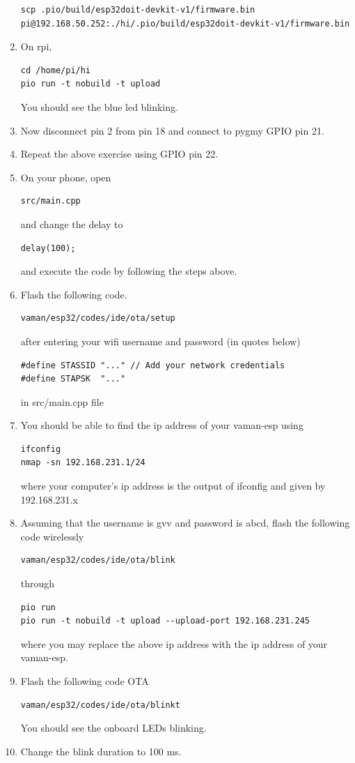 \begin{enumerate}[label=\arabic*.,ref=\theenumi]
\begin{lstlisting}
scp .pio/build/esp32doit-devkit-v1/firmware.bin pi@192.168.50.252:./hi/.pio/build/esp32doit-devkit-v1/firmware.bin
\end{lstlisting}
\item On rpi,
\begin{lstlisting}
cd /home/pi/hi
pio run -t nobuild -t upload
\end{lstlisting}
You should see the blue led blinking.
\item Now disconnect pin 2 from pin 18 and connect to pygmy GPIO pin 21.  
\item Repeat the above exercise using 
	GPIO pin 22.
\item On your phone, open 
\begin{lstlisting}
src/main.cpp 
\end{lstlisting}
and change the delay to 
\begin{lstlisting}
delay(100);
\end{lstlisting}
and execute the code by following the steps above.
\item Flash the following code. 
\begin{lstlisting}
vaman/esp32/codes/ide/ota/setup
\end{lstlisting}
		after entering your wifi username and password (in quotes below)
\begin{lstlisting}
#define STASSID "..." // Add your network credentials
#define STAPSK  "..."
\end{lstlisting}
in src/main.cpp file
\item You should be able to find the ip address of your vaman-esp using 
\begin{lstlisting}
ifconfig
nmap -sn 192.168.231.1/24
\end{lstlisting}
where your computer's ip address is the output of ifconfig and given by 192.168.231.x
\item Assuming that the username is gvv and password is abcd, flash the following code wirelessly
\begin{lstlisting}
vaman/esp32/codes/ide/ota/blink
\end{lstlisting}
through 
\begin{lstlisting}
pio run 
pio run -t nobuild -t upload --upload-port 192.168.231.245
\end{lstlisting}
where you may replace the above ip address with the ip address of your vaman-esp.
\item Flash the following code OTA
\begin{lstlisting}
vaman/esp32/codes/ide/ota/blinkt
\end{lstlisting}
You should see the onboard LEDs blinking.
\item Change the blink duration to 100 ms.
\end{enumerate}

